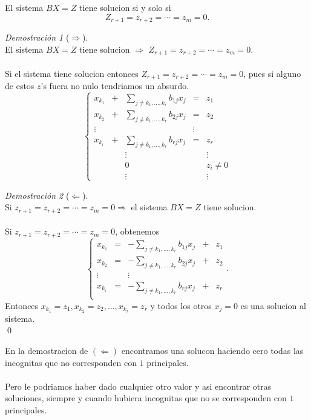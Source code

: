\documentclass{article}
\theoremstyle{definition}
\theoremstyle{definition}
\theoremstyle{remark}
\newtheorem*{demo}{Demostración}
\begin{document}
\begin{teo}
  El sistema $BX=Z$ tiene solucion si y solo si $$Z_{r+1}=z_{r+2}=\cdots =z_{m}=0.$$
\end{teo}
\begin{demo}[$\Rightarrow$]\;\\
  El sistema $BX=Z$ tiene solucion $\Rightarrow$ $Z_{r+1}=z_{r+2}=\cdots =z_{m}=0.$\\\\
  Si el sistema tiene solucion entonces $Z_{r+1}=z_{r+2}=\cdots =z_{m}=0$, pues si alguno de estos $z$'s fuera no nulo tendriamos un absurdo.
\[
  \left\{\begin{array}{ccccc} 
      x_{k_{1}} & + & \sum_{j\neq k_1, \dots, k_r} b_{1j}x_{j} & = & z_1 \\
      x_{k_{2}}& + & \sum_{j\neq k_1, \dots, k_r} b_{2j}x_{j} & = & z_2 \\
      \vdots & && \vdots  \\
      x_{k_{r}} & + & \sum_{j \neq k_1, \dots, k_r}b_{rj}x_{j} & = & z_r \\
              & & \vdots & & \vdots \\
              &&0 &&z_i \neq 0 \\
              &&\vdots &  & \vdots
  \end{array}\right.
\]
\end{demo}
\begin{demo}[$\Leftarrow$] \;\\
  Si $z_{r+1}=z_{r+2}= \cdots = z_{m} = 0 \Rightarrow$ el sistema $BX=Z$ tiene solucion.\\\\
  Si $z_{r+1}=z_{r+2}= \cdots = z_{m} = 0$, obtenemos \[
 \left\{\begin{array}{ccccc} 
      x_{k_{1}} & = & -\sum_{j\neq k_1, \dots, k_r} b_{1j}x_{j} & + & z_1 \\
      x_{k_{2}}& = & -\sum_{j\neq k_1, \dots, k_r} b_{2j}x_{j} & + & z_2 \\
      \vdots & & \vdots  \\
 x_{k_{r}} & = & -\sum_{j\neq k_1, \dots, k_r} b_{rj}x_{j} & + & z_r \\
  \end{array}\right. .
  \]
  Entonces $x_{k_{1}}=z_{1}, x_{k_{2}}=z_2,\dots, x_{k_{r}}=z_r$ y todos los otros $x_j=0$ es una solucion al sistema.\\
\qed
\end{demo}
En la demostracion de $(\Leftarrow)$ encontramos una solucon haciendo cero todas las incognitas que no corresponden con $1$ principales. \\\\ Pero le podriamos haber dado cualquier otro valor y asi encontrar otras soluciones, siempre y cuando hubiera incognitas que no se corresponden con $1$ principales.
\end{document}

